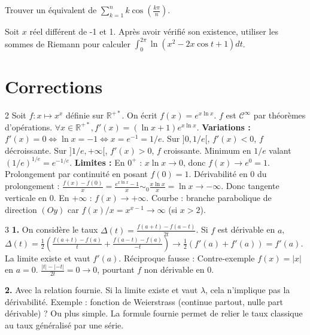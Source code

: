 \begin{exercice}
Trouver un équivalent de $\sum_{k=1}^{n}k \cos(\frac{k\pi}{n})$.
\end{exercice}

\begin{exercice}
Soit $x$ réel différent de -1 et 1.
Après avoir vérifié son existence, utiliser les sommes de Riemann pour calculer $\int_{0}^{2\pi}\ln(x^{2}-2x \cos t + 1)dt$.
\end{exercice}

\newpage
\section{Corrections}

\begin{correction}{2}
Soit $f : x \mapsto x^x$ définie sur $\mathbb{R}^{+*}$.
On écrit $f(x) = e^{x \ln x}$.
$f$ est $\mathcal{C}^{\infty}$ par théorèmes d'opérations.
$\forall x \in \mathbb{R}^{+*}, f'(x) = (\ln x + 1) e^{x \ln x}$.
\textbf{Variations :}
$f'(x) = 0 \iff \ln x = -1 \iff x = e^{-1} = 1/e$.
Sur $]0, 1/e[$, $f'(x) < 0$, $f$ décroissante.
Sur $]1/e, +\infty[$, $f'(x) > 0$, $f$ croissante.
Minimum en $1/e$ valant $(1/e)^{1/e} = e^{-1/e}$.
\textbf{Limites :}
En $0^+$ : $x \ln x \to 0$, donc $f(x) \to e^0 = 1$.
Prolongement par continuité en posant $f(0)=1$.
Dérivabilité en 0 du prolongement :
$\frac{f(x)-f(0)}{x} = \frac{e^{x \ln x}-1}{x} \sim_{0} \frac{x \ln x}{x} = \ln x \to -\infty$.
Donc tangente verticale en 0.
En $+\infty$ : $f(x) \to +\infty$.
Courbe : branche parabolique de direction $(Oy)$ car $f(x)/x = x^{x-1} \to \infty$ (si $x>2$).
\end{correction}

\begin{correction}{3}
\textbf{1.} On considère le taux $\Delta(t) = \frac{f(a+t)-f(a-t)}{2t}$.
Si $f$ est dérivable en $a$, $\Delta(t) = \frac{1}{2} (\frac{f(a+t)-f(a)}{t} + \frac{f(a-t)-f(a)}{-t}) \to \frac{1}{2}(f'(a)+f'(a)) = f'(a)$.
La limite existe et vaut $f'(a)$.
Réciproque fausse : Contre-exemple $f(x)=|x|$ en $a=0$.
$\frac{|t|-|-t|}{2t} = 0 \to 0$, pourtant $f$ non dérivable en 0.

\textbf{2.} Avec la relation fournie.
Si la limite existe et vaut $\lambda$, cela n'implique pas la dérivabilité.
Exemple : fonction de Weierstrass (continue partout, nulle part dérivable) ? Ou plus simple.
La formule fournie permet de relier le taux classique au taux généralisé par une série.
\end{correction}

